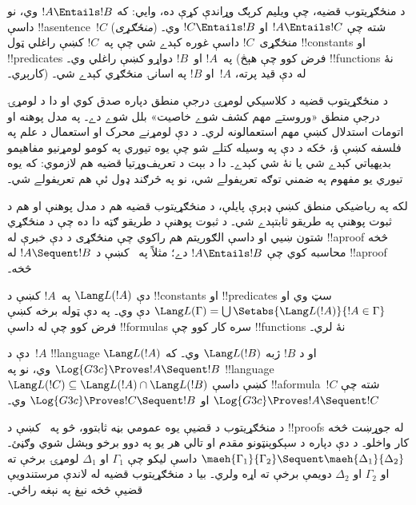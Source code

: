 \documentclass[../../../include/open-logic-section]{subfiles}
\begin{document}


د منځګړيتوب قضيه، چې ويليم کرېګ وړاندې کړې ده، وايي: که $!A
\Entails !B$ وي، نو داسې !!a{sentence}~$!C$ (\emph{منځګړی}) شته
چې $!A \Entails !C$ او $!C \Entails !B$ وي۔ منځګړی~$!C$ داسې
غوره کېدے شي چې په~$!C$ کښې راغلي ټول !!{constant}s او !!{predicate}s
په~$!A$ او~$!B$ دواړو کښې راغلي وي۔ (فرض کوو چې هېڅ !!{function}s
نۀ کارېږي۔) له دې قيد پرته، $!A$~او $!B$ په اسانۍ منځګړي کېدے شي۔

د منځګړيتوب قضيه د کلاسيکي لومړۍ درجې منطق دپاره صدق کوي او
دا د لومړۍ درجې منطق «وروستے مهم کشف شوے خاصيت» بلل شوے دے۔
په مدل پوهنه او اتومات استدلال کښې مهم استعمالونه لري۔ د دې
لومړنے محرک او استعمال د علم په فلسفه کښې ؤ، ځکه د دې په وسيله
کتلے شو چې يوه تيوري په کومو لومړنيو مفاهيمو بديهياتي کېدے شي
يا نۀ شي کېدے۔ دا د بېت د تعريف‌وړتيا قضيه هم لازموي: که يوه
تيوري يو مفهوم په ضمني توګه تعريفولے شي، نو په څرګند ډول ئې هم
تعريفولے شي۔

لکه په رياضيکي منطق کښې ډېرې پايلې، د منځګړيتوب قضيه هم د
مدل پوهنې او هم د ثبوت پوهنې په طريقو ثابتېدے شي۔ د ثبوت پوهنې
د طريقو ګټه دا ده چې د منځګړي شتون ښيي او داسې الګوريتم هم راکوي
چې منځګړی د دې خبرې له !!a{proof} څخه محاسبه کوي چې $!A \Entails !B$
دے؛ مثلاً په~ کښې د $!A \Sequent !B$ له !!a{proof} څخه۔

دې $\Lang L(!A)$ په~$!A$ کښې د !!{constant}s او !!{predicate}s
سټ وي او $\Lang L(\Gamma) = \bigcup \Setabs{\Lang L(!A)}{!A \in
\Gamma}$ دې وي۔ په دې ټوله برخه کښې فرض کوو چې له داسې
!!{formula}s سره کار کوو چې !!{function}s نۀ لري۔

\begin{thm}
دې د~$!A$ !!{language} $\Lang L(!A)$ او د $!B$ ژبه
$\Lang L(!B)$ وي۔ که $\Log{G3c} \Proves !A \Sequent !B$ وي،
نو په !!{language}~$\Lang L(!C) \subseteq \Lang
L(!A) \cap \Lang L(!B)$ کښې داسې !!a{formula}~$!C$ شته چې
$\Log{G3c} \Proves !A \Sequent !C$ او
$\Log{G3c} \Proves !C \Sequent !B$ وي۔
\end{thm}

د منځګړيتوب د قضيې يوه عمومي بڼه ثابتوو، څو په~ کښې
د !!{proof}s له جوړښت څخه کار واخلو۔ د دې دپاره د سېکوېنټونو
مقدم او تالي هر يو په دوو برخو وېشل شوي وګڼئ۔
$\maeh{\Gamma_1}{\Gamma_2} \Sequent
\maeh{\Delta_1}{\Delta_2}$ داسې ليکو چې $\Gamma_1$ او $\Delta_1$
لومړۍ برخې ته او $\Gamma_2$ او $\Delta_2$ دويمې برخې ته اړه ولري۔
بيا د منځګړيتوب قضيه له لاندې مرستندويې قضيې څخه نېغ په نېغه راځي۔
\end{document}
